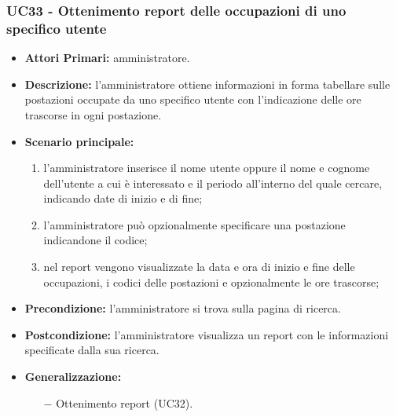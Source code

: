 \subsubsection{ UC33 - Ottenimento report delle occupazioni di uno specifico utente}
\begin{itemize}
	\item\textbf{Attori Primari:} 
	amministratore.
	\item\textbf{Descrizione:} 
	l'amministratore ottiene informazioni in forma tabellare sulle postazioni occupate da uno specifico utente con l'indicazione delle ore trascorse in ogni postazione.
	\item\textbf{Scenario principale:}
	\begin{enumerate}
		\item l'amministratore inserisce il nome utente oppure il nome e cognome dell'utente a cui è interessato e il periodo all'interno del quale cercare, indicando date di inizio e di fine;
		\item l'amministratore può opzionalmente specificare una postazione indicandone il codice;
		\item nel report vengono visualizzate la data e ora di inizio e fine delle occupazioni, i codici delle postazioni e opzionalmente le ore trascorse;
	\end{enumerate}
	\item\textbf{Precondizione:} 
	l'amministratore si trova sulla pagina di ricerca.
	\item\textbf{Postcondizione:}
	l'amministratore visualizza un report con le informazioni specificate dalla sua ricerca.
	\item\textbf{Generalizzazione:}
	\begin{itemize}
		\item[$-$] Ottenimento report (UC32).
	\end{itemize}
\end{itemize}

